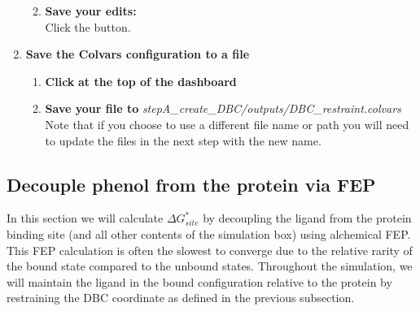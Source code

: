 \documentclass[9pt,tutorial]{Styling/livecoms}
\newcommand{\filepath}[1]{\textit{#1}}
\newcommand{\button}[1]{
  \inlineBox[gray]{\texttt{#1}}
}
\begin{document}
\begin{enumerate}
\begin{enumerate}[label=\alph*., ref=\theenumi.\alph*]
\begin{itemize}
            \end{itemize}
            \item \textbf{Save your edits:}\\
            Click the \button{Apply [Ctrl-s]} button.
        \end{enumerate}
        \item \textbf{Save the Colvars configuration to a file}
        \begin{enumerate}[label=\alph*., ref=\theenumi.\alph*]
            \item \textbf{Click} \button{Save} \textbf{at the top of the dashboard}
            \item \textbf{Save your file to} \filepath{stepA\_create\_DBC/outputs/DBC\_restraint.colvars}\\
            Note that if you choose to use a different file name or path you will need to update the files in the next step with the new name.
        \end{enumerate}
    \end{enumerate}

\subsection{Decouple phenol from the protein via FEP}\label{step:proteinDecouple}
    \begin{tcolorbox}[colback=blue!5!white,colframe=blue!75!black]
    In this section we will calculate $\Delta G_{site}^*$ by decoupling the ligand from the protein binding site (and all other contents of the simulation box) using alchemical FEP. This FEP calculation is often the slowest to converge due to the relative rarity of the bound state compared to the unbound states. Throughout the simulation, we will maintain the ligand in the bound configuration relative to the protein by restraining the DBC coordinate as defined in the previous subsection.
    \end{tcolorbox}
    
\end{document}
